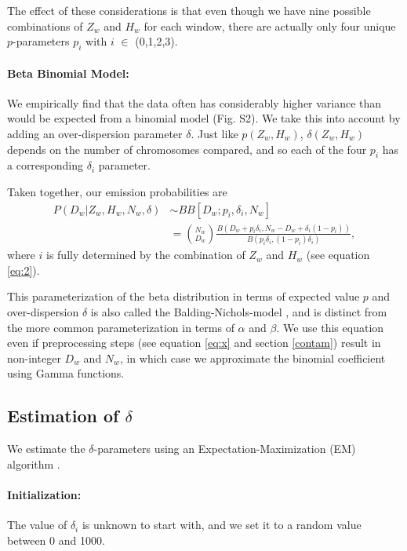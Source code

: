 \documentclass[12pt, letterpaper]{article}
\begin{document}
The effect of these considerations is that even though we have nine possible combinations of $Z_w$ and $H_w$ for each window, there are actually only four unique $p$-parameters $p_i$ with $i$ $\in$ (0,1,2,3). 

\paragraph{Beta Binomial Model:}
We empirically find that the data often has considerably higher variance than would be expected from a binomial model (Fig. S2). We take this into account by adding an over-dispersion parameter $\delta$. Just like $p(Z_w,H_w)$, $\delta(Z_w,H_w)$ depends on the number of chromosomes compared, and so each of the  four $p_i$ has a corresponding $\delta_i$ parameter. 

Taken together, our emission probabilities are 
\begin{align}\label{eq:3}
P(D_{w}|Z_w,H_w,N_w, \delta) &\sim BB[D_w; p_i, \delta_i, N_w] \nonumber\\
&= \binom{N_w}{D_w}\frac{B(D_w+p_i \delta_{i}, N_w-D_w+ \delta_{i}(1-p_{i}))}{ B(p_{i}\delta_{i}, (1-p_{i})\delta_{i})},
\end{align}
where $i$ is fully determined by the combination of $Z_w$ and $H_w$ (see equation \ref{eq:2}).

This parameterization of the beta distribution in terms of expected value $p$ and over-dispersion $\delta$ is also called the Balding-Nichols-model \cite{balding_method_nodate}, and is distinct from the more common parameterization in terms of $\alpha$ and $\beta$. We use this equation even if preprocessing steps (see equation \ref{eq:x} and section \ref{contam}) result in non-integer $D_w$ and $N_w$, in which case we approximate the binomial coefficient using Gamma functions.   

\subsection{Estimation of $\delta$}\label{delta}
We estimate the $\delta$-parameters using an Expectation-Maximization (EM) algorithm \cite{dempster_maximum_1977}.

\paragraph{Initialization:}
The value of $\delta_i$ is unknown to start with, and we set it to a random value between 0 and 1000.
\end{document}
